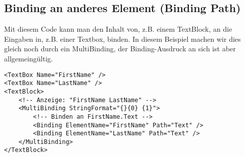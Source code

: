 \subsection{Binding an anderes Element (Binding Path)}
Mit diesem Code kann man den Inhalt von, z.B. einem TextBlock, an die Eingaben in, z.B. einer Textbox, binden. In diesem Beispiel machen wir dies gleich noch durch ein MultiBinding, der Binding-Ausdruck an sich ist aber allgemeingültig.

\begin{lstlisting}
<TextBox Name="FirstName" />
<TextBox Name="LastName" />
<TextBlock>
    <!-- Anzeige: "FirstName LastName" -->
    <MultiBinding StringFormat="{}{0} {1}">
        <!-- Binden an FirstName.Text -->
        <Binding ElementName="FirstName" Path="Text" />
        <Binding ElementName="LastName" Path="Text" />
    </MultiBinding>
</TextBlock>
\end{lstlisting}